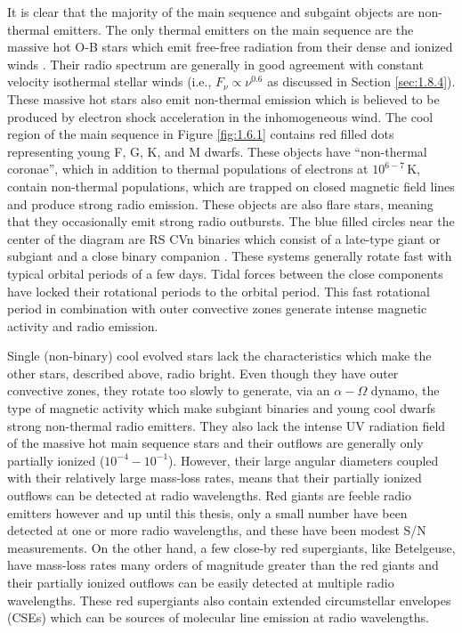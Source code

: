 It is clear that the majority of the main sequence and subgaint objects are non-thermal emitters. The only thermal emitters on the main sequence are the massive hot O-B stars which emit free-free radiation from their dense and ionized winds \cite[e.g.,][]{scuderi_1998}. Their radio spectrum are generally in good agreement with constant velocity isothermal stellar winds (i.e., $F_{\nu} \propto \nu ^{0.6}$ as discussed in Section \ref{sec:1.8.4}). These massive hot stars also emit non-thermal emission which is believed to be produced by electron shock acceleration in the inhomogeneous wind. The cool region of the main sequence in Figure \ref{fig:1.6.1} contains red filled dots representing young F, G, K, and M dwarfs. These objects have ``non-thermal coronae'', which in addition to thermal populations of electrons at $10^{6-7}$\,K, contain non-thermal populations, which are trapped on closed magnetic field lines and produce strong radio emission. These objects are also flare stars, meaning that they occasionally emit strong radio outbursts. The blue filled circles near the center of the diagram are RS CVn binaries which consist of a late-type giant or subgiant and a close binary companion \citep{strassmeier_1993}. These systems generally rotate fast with typical orbital periods of a few days. Tidal forces between the close components have locked  their rotational periods to the orbital period. This fast rotational period in combination with outer convective zones generate intense magnetic activity and radio emission. 

Single (non-binary) cool evolved stars lack the characteristics which make the other stars, described above, radio bright. Even though they have outer convective zones, they rotate too slowly to generate, via an $\alpha - \Omega$ dynamo, the type of magnetic activity which make subgiant binaries and young cool dwarfs strong non-thermal radio emitters. They also lack the intense UV radiation field of the massive hot main sequence stars and their outflows are generally only partially ionized ($10^{-4} - 10^{-1}$). However, their large angular diameters coupled with their relatively large mass-loss rates, means that their partially ionized outflows can be detected at radio wavelengths. Red giants are feeble radio emitters however and up until this thesis, only a small number have been detected at one or more radio wavelengths, and these have been modest S/N measurements. On the other hand, a few close-by red supergiants, like Betelgeuse, have mass-loss rates many orders of magnitude greater than the red giants and their partially ionized outflows can be easily detected at multiple radio wavelengths. These red supergiants also contain extended circumstellar envelopes (CSEs) which can be  sources of molecular line emission at radio wavelengths. 

